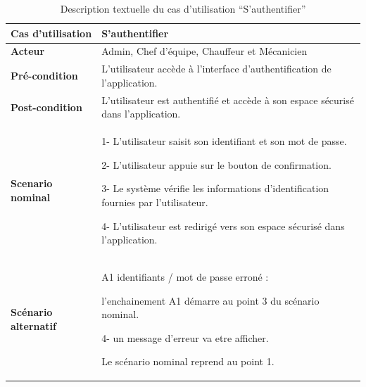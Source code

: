\begin{table}[htbp]
  \centering
  \renewcommand{\arraystretch}{1.5} %
  \begin{tabular}{|p{4cm}|p{9cm}|}
    \hline
    \textbf{Cas d'utilisation}   & S'authentifier                                                                                                                   \\
    \hline
    \textbf{Acteur}              & Admin, Chef d’équipe, Chauffeur et Mécanicien                                                                                    \\
    \hline
    \textbf{Pré-condition}       & L'utilisateur accède à l'interface d'authentification de l'application.                                                          \\
    \hline
    \textbf{Post-condition}      & L'utilisateur est authentifié et accède à son espace sécurisé dans l'application.                                                \\
    \hline
    \textbf{Scenario nominal}    & 1- L'utilisateur saisit son identifiant et son mot de passe.\newline

    2- L'utilisateur appuie sur le bouton de confirmation.\newline

    3- Le système vérifie les informations d'identification fournies par l'utilisateur. \newline

    4- L'utilisateur est redirigé vers son espace sécurisé dans l'application.                                                                                      \\


    \hline
    \textbf{Scénario alternatif} & A1 identifiants / mot de passe erroné :                                                                                 \newline

    l'enchainement A1 démarre au point 3 du scénario nominal. \newline

    4- un message d'erreur va etre afficher. \newline

    Le scénario nominal reprend au point 1.                                                                                                                         \\
    \hline
  \end{tabular}
  \caption{Description textuelle du cas d’utilisation “S’authentifier”}

\end{table}
\newpage
